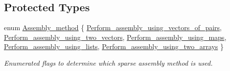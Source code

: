 \subsection*{Protected Types}
\begin{DoxyCompactItemize}
\item 
enum \hyperlink{classoomph_1_1Problem_ac793c004113930938730ec04dd2245b7}{Assembly\+\_\+method} \{ \newline
\hyperlink{classoomph_1_1Problem_ac793c004113930938730ec04dd2245b7aa00e1772bb5ccf1c837a2bad2f240241}{Perform\+\_\+assembly\+\_\+using\+\_\+vectors\+\_\+of\+\_\+pairs}, 
\hyperlink{classoomph_1_1Problem_ac793c004113930938730ec04dd2245b7a6008d2b6aa449ee405313b49632d18ff}{Perform\+\_\+assembly\+\_\+using\+\_\+two\+\_\+vectors}, 
\hyperlink{classoomph_1_1Problem_ac793c004113930938730ec04dd2245b7a406ad24599e1a59450acdd09bac1d717}{Perform\+\_\+assembly\+\_\+using\+\_\+maps}, 
\hyperlink{classoomph_1_1Problem_ac793c004113930938730ec04dd2245b7ad73bb55e4e1f000cfd6930cb8b2a52f8}{Perform\+\_\+assembly\+\_\+using\+\_\+lists}, 
\newline
\hyperlink{classoomph_1_1Problem_ac793c004113930938730ec04dd2245b7a1383f03857ad8602ba7edef43bd947f5}{Perform\+\_\+assembly\+\_\+using\+\_\+two\+\_\+arrays}
 \}\begin{DoxyCompactList}\small\item\em Enumerated flags to determine which sparse assembly method is used. \end{DoxyCompactList}
\end{DoxyCompactItemize}
